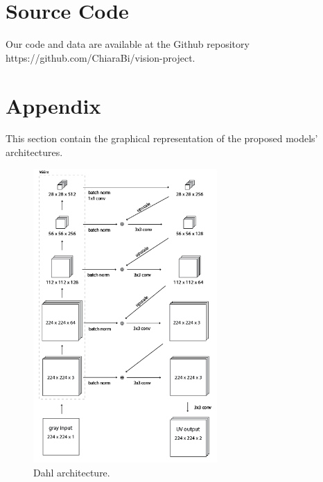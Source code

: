 \documentclass[10pt,twocolumn,letterpaper]{article}
\begin{document}







\section*{Source Code}
Our code and data are available at the Github repository https://github.com/ChiaraBi/vision-project.
\clearpage
\onecolumn
{\small


}

\section*{Appendix}
This section contain the graphical representation of the proposed models' architectures.

\begin{figure}[htbp]
	\centering
	\includegraphics[width=7cm]{diagram dahl.jpg}
	\caption{Dahl architecture.}
	\label{fig:dahl}
\end{figure}
\end{document}
